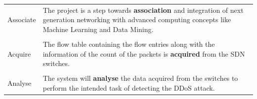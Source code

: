 \documentclass[12pt,a4paper,final]{report}
\begin{document}
\vspace*{1cm}
\begin{center}
\begin{tabular}{|m{2cm}|m{7cm}|}
\hline

Associate & The project is a step towards \textbf{association} and integration of next generation networking with advanced computing concepts like Machine Learning and Data Mining. \\

&\\

Acquire & The flow table containing the flow entries along with the information of the count of the packets is \textbf{acquired} from the SDN switches. \\

&\\

Analyse & The system will \textbf{analyse} the data acquired from the switches to perform the intended task of detecting the DDoS attack. \\

\hline
\end{tabular}
\end{center}
\end{document}
